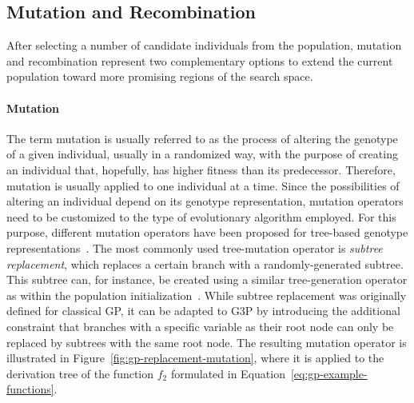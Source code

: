 \subsection{Mutation and Recombination}
\label{sec:gggp-mutation-and-recombination}
After selecting a number of candidate individuals from the population, mutation and recombination represent two complementary options to extend the current population toward more promising regions of the search space.
\paragraph{Mutation}
The term mutation is usually referred to as the process of altering the genotype of a given individual, usually in a randomized way, with the purpose of creating an individual that, hopefully, has higher fitness than its predecessor.
Therefore, mutation is usually applied to one individual at a time.
Since the possibilities of altering an individual depend on its genotype representation, mutation operators need to be customized to the type of evolutionary algorithm employed.
For this purpose, different mutation operators have been proposed for tree-based genotype representations~\cite{poli2008field,koza1994genetic}.
The most commonly used tree-mutation operator is \emph{subtree replacement}, which replaces a certain branch with a randomly-generated subtree.
This subtree can, for instance, be created using a similar tree-generation operator as within the population initialization~\cite{poli2008field}.
While subtree replacement was originally defined for classical GP, it can be adapted to G3P by introducing the additional constraint that branches with a specific variable as their root node can only be replaced by subtrees with the same root node.
The resulting mutation operator is illustrated in Figure~\ref{fig:gp-replacement-mutation}, where it is applied to the derivation tree of the function $f_2$ formulated in Equation~\eqref{eq:gp-example-functions}.
